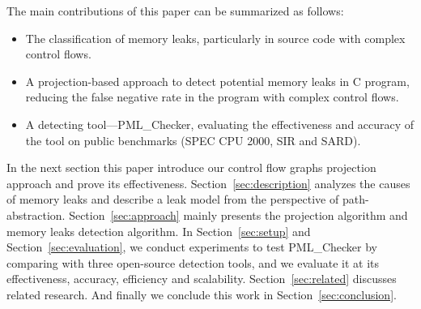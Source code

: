 The main contributions of this paper can be summarized as follows:
\begin{itemize}
\item The classification of memory leaks, particularly in source code with complex control flows.
\item A projection-based approach to detect potential memory leaks in C program, reducing the false negative rate in the program with complex control flows.
\item A detecting tool---PML\_Checker, evaluating the effectiveness and accuracy of the tool on public benchmarks (SPEC CPU 2000, SIR and SARD). 
\end{itemize}

In the next section this paper introduce our control flow graphs projection approach and prove its effectiveness. Section~\ref{sec:description} analyzes the causes of memory leaks and describe a leak model from the perspective of path-abstraction. Section~\ref{sec:approach} mainly presents the projection algorithm and memory leaks detection algorithm. In Section~\ref{sec:setup} and Section~\ref{sec:evaluation}, we conduct experiments to test PML\_Checker by comparing with three open-source detection tools, and we evaluate it at its effectiveness, accuracy, efficiency and scalability. Section~\ref{sec:related} discusses related research. And finally we conclude this work in Section~\ref{sec:conclusion}.

